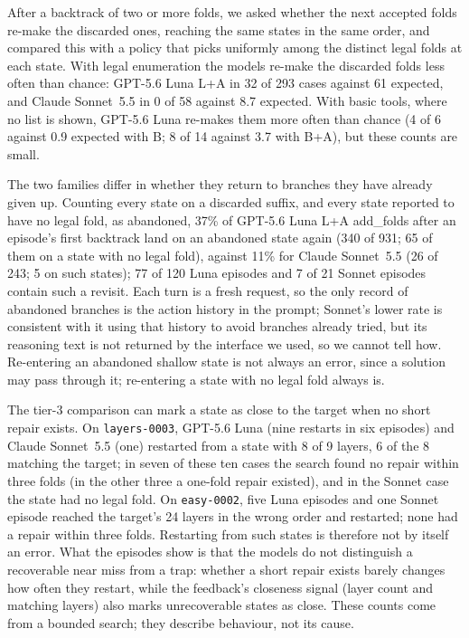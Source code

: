 After a backtrack of two or more folds, we asked whether the next accepted folds re-make the
discarded ones, reaching the same states in the same order, and compared this with a policy that
picks uniformly among the distinct legal folds at each state. With legal enumeration the models
re-make the discarded folds less often than chance: GPT-5.6 Luna L+A in 32 of 293 cases against
61 expected, and Claude Sonnet~5.5 in 0 of 58 against 8.7 expected. With basic tools, where no
list is shown, GPT-5.6 Luna re-makes them more often than chance (4 of 6 against 0.9 expected with
B; 8 of 14 against 3.7 with B+A), but these counts are small.

The two families differ in whether they return to branches they have already given up. Counting
every state on a discarded suffix, and every state reported to have no legal fold, as abandoned,
37\% of GPT-5.6 Luna L+A add\_folds after an episode's first backtrack land on an abandoned state
again (340 of 931; 65 of them on a state with no legal fold), against 11\% for Claude Sonnet~5.5
(26 of 243; 5 on such states); 77 of 120 Luna episodes and 7 of 21 Sonnet episodes contain such a
revisit. Each turn is a fresh request, so the only record of abandoned branches is the action
history in the prompt; Sonnet's lower rate is consistent with it using that history to avoid
branches already tried, but its reasoning text is not returned by the interface we used, so we
cannot tell how. Re-entering an abandoned shallow state is not always an error, since a solution
may pass through it; re-entering a state with no legal fold always is.

The tier-3 comparison can mark a state as close to the target when no short repair exists. On
\texttt{layers-0003}, GPT-5.6 Luna (nine restarts in six episodes) and Claude Sonnet~5.5 (one)
restarted from a state with 8 of 9 layers, 6 of the 8 matching the target; in seven of these ten
cases the search found no repair within three folds (in the other three a one-fold repair
existed), and in the Sonnet case the state had no legal fold. On \texttt{easy-0002}, five Luna
episodes and one Sonnet episode reached the target's 24 layers in the wrong order and restarted;
none had a repair within three folds. Restarting from such states is therefore not by itself an
error. What the episodes show is that the models do not distinguish a recoverable near miss from a
trap: whether a short repair exists barely changes how often they restart, while the feedback's closeness signal (layer count and matching layers)
also marks unrecoverable states as close. These counts come from a bounded search; they describe
behaviour, not its cause.


